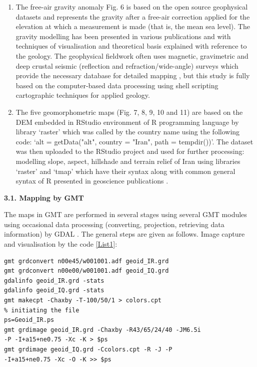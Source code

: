 \documentclass[12pt,a4paper,oneside]{article}
\def \newsubsection{\vspace{12pt}\textbf}
\def \newpar{\vspace{6pt}}
\begin{document}
\begin{enumerate}
	\item The free-air gravity anomaly Fig. 6 is based on the open source geophysical datasets \cite{Sandwell1997,Sandwell2014} and represents the gravity after a free-air correction applied for the elevation at which a measurement is made (that is, the mean sea level). The gravity modelling has been presented in various publications \cite{Lemenkova2020i} and \cite{Djamour} with techniques of visualisation and theoretical basis explained with reference to the geology. The geophysical fieldwork often uses magnetic, gravimetric and deep crustal seismic (reflection and refraction/wide-angle) surveys which provide the necessary database for detailed mapping \cite{Gohl2006a,Gohl2006b,Kuhn}, but this study is fully based on the computer-based data processing using shell scripting cartographic techniques for applied geology.
	\item The five geomorphometric maps (Fig. 7, 8, 9, 10 and 11) are based on the DEM embedded in RStudio environment \cite{RStudio} of R programming language \cite{RCoreTeam} by library ‘raster’ which was called by the country name using the following code: ‘alt = getData("alt", country = "Iran", path = tempdir())’. The dataset was then uploaded to the RStudio project and used for further processing: modelling slope, aspect, hillshade and terrain relief of Iran using libraries ‘raster’ \cite{Hijmans} and ‘tmap’ \cite{Tennekes} which have their syntax along with common general syntax of R presented in geoscience publications \cite{Lemenkova2019b,Lemenkova202007}.  
\end{enumerate}

\newsubsection {3.1. Mapping by GMT}

\newpar The maps in GMT are performed in several stages using several GMT modules \cite{Wessel2019} using occasional data processing (converting, projection, retrieving data information) by GDAL \cite{GDAL}. The general steps are given as follows. Image capture and visualisation by the code \ref{List1}:

\begin{lstlisting}[frame=single,basicstyle=\scriptsize]
gmt grdconvert n00e45/w001001.adf geoid_IR.grd
gmt grdconvert n00e00/w001001.adf geoid_IQ.grd
gdalinfo geoid_IR.grd -stats
gdalinfo geoid_IQ.grd -stats
gmt makecpt -Chaxby -T-100/50/1 > colors.cpt
% initiating the file
ps=Geoid_IR.ps
gmt grdimage geoid_IR.grd -Chaxby -R43/65/24/40 -JM6.5i 
-P -I+a15+ne0.75 -Xc -K > $ps
gmt grdimage geoid_IQ.grd -Ccolors.cpt -R -J -P 
-I+a15+ne0.75 -Xc -O -K >> $ps
\end{lstlisting}
\end{document}
